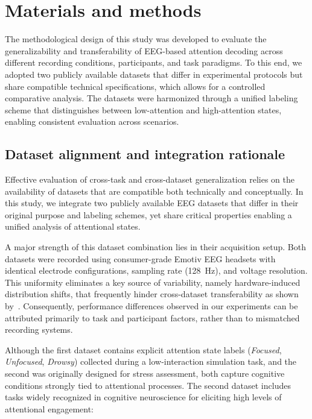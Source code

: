 \documentclass[10pt,letterpaper]{article}
\begin{document}
\section*{Materials and methods}

The methodological design of this study was developed to evaluate the generalizability and transferability of EEG-based attention decoding across different recording conditions, participants, and task paradigms. To this end, we adopted two publicly available datasets that differ in experimental protocols but share compatible technical specifications, which allows for a controlled comparative analysis. The datasets were harmonized through a unified labeling scheme that distinguishes between low-attention and high-attention states, enabling consistent evaluation across scenarios.

\subsection*{Dataset alignment and integration rationale}

Effective evaluation of cross-task and cross-dataset generalization relies on the availability of datasets that are compatible both technically and conceptually. In this study, we integrate two publicly available EEG datasets that differ in their original purpose and labeling schemes, yet share critical properties enabling a unified analysis of attentional states.

A major strength of this dataset combination lies in their acquisition setup. Both datasets were recorded using consumer-grade Emotiv EEG headsets with identical electrode configurations, sampling rate (128~Hz), and voltage resolution. This uniformity eliminates a key source of variability, namely hardware-induced distribution shifts, that frequently hinder cross-dataset transferability as shown by~\cite{li2020domain}. Consequently, performance differences observed in our experiments can be attributed primarily to task and participant factors, rather than to mismatched recording systems.

Although the first dataset contains explicit attention state labels (\textit{Focused}, \textit{Unfocused}, \textit{Drowsy}) collected during a low-interaction simulation task, and the second was originally designed for stress assessment, both capture cognitive conditions strongly tied to attentional processes. The second dataset includes tasks widely recognized in cognitive neuroscience for eliciting high levels of attentional engagement:
\end{document}

